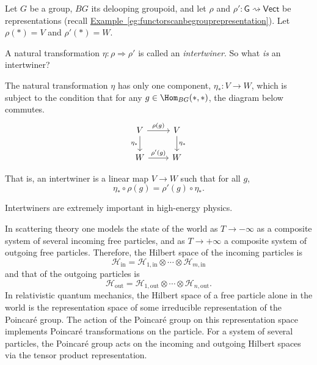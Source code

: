 \documentclass[main.tex]{subfiles}
\begin{document}
\begin{example}
  \label{eg:intertwinersarenaturaltransformations}
  Let $G$ be a group, $BG$ its delooping groupoid, and let $\rho$ and $\rho'\colon \mathsf{G} \rightsquigarrow \mathsf{Vect}$ be representations (recall \hyperref[eg:functorscanbegrouprepresentation]{Example~\ref*{eg:functorscanbegrouprepresentation}}). Let $\rho(*) = V$ and $\rho'(*) = W$.

  A natural transformation $\eta\colon \rho \Rightarrow \rho'$ is called an \emph{intertwiner}. So what \emph{is} an intertwiner?

  The natural transformation $\eta$ has only one component, $\eta_{*}\colon V \to W$, which is subject to the condition that for any $g \in \Hom_{BG}(*,*)$, the diagram below commutes.
  \begin{equation*}
    \begin{tikzcd}
      V
      \arrow[r, "\rho(g)"]
      \arrow[d, swap, "\eta_{*}"]
      & V
      \arrow[d, "\eta_{*}"]
      \\
      W
      \arrow[r, "\rho'(g)"]
      & W
    \end{tikzcd}
  \end{equation*}

  That is, an intertwiner is a linear map $V \to W$ such that for all $g$,
  \begin{equation*}
    \eta_{*} \circ \rho(g) = \rho'(g) \circ \eta_{*}.
  \end{equation*}

  Intertwiners are extremely important in high-energy physics.

  In scattering theory one models the state of the world as $T \to - \infty$ as a composite system of several incoming free particles, and as $T \to +\infty$ a composite system of outgoing free particles. Therefore, the Hilbert space of the incoming particles is
  \begin{equation*}
    \mathscr{H}_{\mathrm{in}} = \mathscr{H}_{1, \mathrm{in}} \otimes \cdots \otimes \mathscr{H}_{m, \mathrm{in}}
  \end{equation*}
  and that of the outgoing particles is
  \begin{equation*}
    \mathscr{H}_{\mathrm{out}} = \mathscr{H}_{1, \mathrm{out}} \otimes \cdots \otimes \mathscr{H}_{n, \mathrm{out}}.
  \end{equation*}
  In relativistic quantum mechanics, the Hilbert space of a free particle alone in the world is the representation space of some irreducible representation of the Poincaré group. The action of the Poincaré group on this representation space implements Poincaré transformations on the particle. For a system of several particles, the Poincaré group acts on the incoming and outgoing Hilbert spaces via the tensor product representation.


\end{example}
\end{document}
